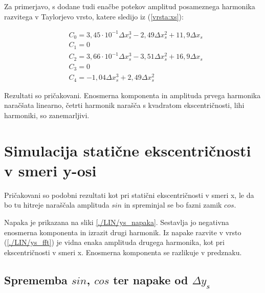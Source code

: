 Za primerjavo, s dodane tudi enačbe potekov amplitud posameznega harmonika razvitega v Taylorjevo vrsto, katere sledijo iz (\ref{vrsta:xs}):

\begin{eqnarray}
&C_0 =3,45\cdot 10^{-1}\Delta x_s^{3}-2,49\Delta x_s^{2}+11,9\Delta x_s \\
&C_1 = 0\\
&C_2 =3,66\cdot 10^{-1}\Delta x_s^{3}-3,51\Delta x_s^{2}+16,9\Delta x_s\\
&C_3 = 0\\
&C_4 =-1,04\Delta x_s^{3}+2,49\Delta x_s^{2}
\end{eqnarray}

Rezultati so pričakovani. Enosmerna komponenta in amplituda prvega harmonika naračšata linearno, četrti harmonik narašča s kvadratom ekscentričnosti, lihi harmoniki, so zanemarljivi.



\section{Simulacija statične ekscentričnosti v smeri y-osi}

Pričakovani so podobni rezultati kot pri statični ekscentričnosti v smeri x, le da bo tu hitreje naraščala amplituda $sin$ in spreminjal se bo fazni zamik $cos$.
 

Napaka je prikazana na sliki \ref{./LIN/ys_napaka}. Sestavlja jo negativna enosmerna komponenta in izrazit drugi harmonik. Iz napake razvite v vrsto (\ref{./LIN/ys_fft}) je vidna enaka amplituda drugega harmonika, kot pri ekscentričnosti v smeri x. Enosmerna komponenta se razlikuje v predznaku.
\newpage
\subsection{Sprememba $sin$, $cos$ ter napake od $\Delta y_s$}

